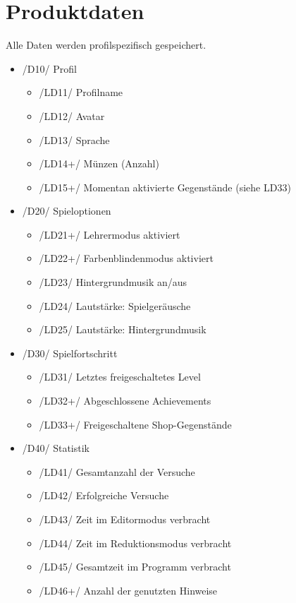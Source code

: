 \section{Produktdaten}

Alle Daten werden profilspezifisch gespeichert.

\begin{itemize}

\item /D10/ Profil
\begin{itemize}
\item /LD11/ Profilname
\item /LD12/ Avatar
\item /LD13/ Sprache
\item /LD14+/ Münzen (Anzahl)
\item /LD15+/ Momentan aktivierte Gegenstände (siehe LD33)
\end{itemize}

\item /D20/ Spieloptionen
\begin{itemize}
\item /LD21+/ Lehrermodus aktiviert
\item /LD22+/ Farbenblindenmodus aktiviert
\item /LD23/ Hintergrundmusik an/aus
\item /LD24/ Lautstärke: Spielgeräusche
\item /LD25/ Lautstärke: Hintergrundmusik
\end{itemize}

\item /D30/ Spielfortschritt
\begin{itemize}
\item /LD31/ Letztes freigeschaltetes Level
\item /LD32+/ Abgeschlossene Achievements
\item /LD33+/ Freigeschaltene Shop-Gegenstände
\end{itemize}

\item /D40/ Statistik
\begin{itemize}
\item /LD41/ Gesamtanzahl der Versuche
\item /LD42/ Erfolgreiche Versuche
\item /LD43/ Zeit im Editormodus verbracht
\item /LD44/ Zeit im Reduktionsmodus verbracht
\item /LD45/ Gesamtzeit im Programm verbracht
\item /LD46+/ Anzahl der genutzten Hinweise
\end{itemize}

\end{itemize}
